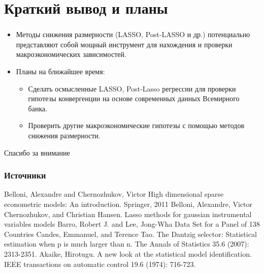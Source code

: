 \documentclass[c, dvipsnames]{beamer}  %
\begin{document}
\section{Краткий вывод и планы}
\begin{frame}
\frametitle{\insertsection} 
\begin{itemize}
    \item  Методы снижения размерности (LASSO, Post-LASSO и др.) потенциально представляют собой мощный инструмент для нахождения и проверки макроэкономических зависимостей.
    \item Планы на ближайшее время:
    \begin{itemize}
        \item  Сделать осмысленные LASSO, Post-Lasso регрессии для проверки гипотезы конвергенции на основе современных данных Всемирного банка.
        \item Проверить другие макроэкономические гипотезы с помощью методов снижения размерности.
    \end{itemize}
\end{itemize}
   
    
\end{frame}



\begin{frame}[c, plain]
\begin{center}

{\LARGE Спасибо за внимание}

\bigskip

{\Large \inserttitle}

\bigskip

{\insertauthor} 

\bigskip

\bigskip\bigskip

{\large \insertdate}
\end{center}
\end{frame}



\begin{frame}[c, plain]
  \frametitle{Источники}    
  \begin{thebibliography}{10}    
  \beamertemplatearticlebibitems
    Belloni, Alexandre and Chernozhukov, Victor
    \newblock High dimensional sparse econometric models: An introduction.
    \newblock Springer, 2011
   Belloni, Alexandre, Victor Chernozhukov, and Christian Hansen. 
   \newblock Lasso methods for gaussian instrumental variables models
    Barro, Robert J.  and Lee, Jong-Wha 
    \newblock Data Set for a Panel of 138 Countries
     Candes, Emmanuel, and Terence Tao. 
    \newblock The Dantzig selector: Statistical estimation when p is much larger than n.
    \newblock The Annals of Statistics 35.6 (2007): 2313-2351.
     Akaike, Hirotugu.
    \newblock A new look at the statistical model identification.
    \newblock IEEE transactions on automatic control 19.6 (1974): 716-723.
  \end{thebibliography}
\end{frame}
\end{document}
